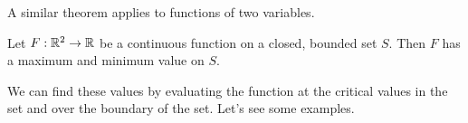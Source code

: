 \documentclass{ximera}
\begin{document}
\begin{theorem}
\begin{image}
\end{image}
\end{theorem}

A similar theorem applies to functions of two variables.

\begin{theorem}
  Let $F:\mathbb R^2\to\mathbb R$ be a continuous function on a closed, bounded set
  $S$. Then $F$ has a maximum and minimum value on $S$.
\end{theorem}

We can find these values by evaluating the function at the critical
values in the set and over the boundary of the set. Let's see some
examples.
\end{document}
